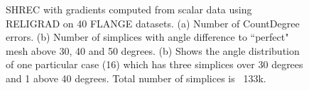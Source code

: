 \begin{figure}[htb]
	\caption{SHREC with gradients computed from scalar data using RELIGRAD on 40  FLANGE datasets. (a) Number of CountDegree errors. (b) Number of simplices with angle difference to ``perfect" mesh above 30, 40 and 50 degrees. (b) Shows the angle distribution of one particular case (16) which has three simplices over 30 degrees and 1 above 40 degrees. Total number of simplices is ~133k.}\label{fig:flangeAngle}
\end{figure}
